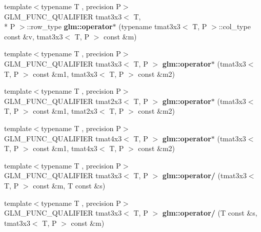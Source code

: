 \begin{DoxyCompactItemize}
\item 
\hypertarget{namespaceglm_a12af2d564dc38d2f7051131cd51d4c66}{{\footnotesize template$<$typename T , precision P$>$ }\\G\-L\-M\-\_\-\-F\-U\-N\-C\-\_\-\-Q\-U\-A\-L\-I\-F\-I\-E\-R tmat3x3$<$ T, \\*
P $>$\-::row\-\_\-type {\bfseries glm\-::operator$\ast$} (typename tmat3x3$<$ T, P $>$\-::col\-\_\-type const \&v, tmat3x3$<$ T, P $>$ const \&m)}\label{namespaceglm_a12af2d564dc38d2f7051131cd51d4c66}

\item 
\hypertarget{namespaceglm_aa501d4e3af1aca4edd6f5b6948003b32}{{\footnotesize template$<$typename T , precision P$>$ }\\G\-L\-M\-\_\-\-F\-U\-N\-C\-\_\-\-Q\-U\-A\-L\-I\-F\-I\-E\-R tmat3x3$<$ T, P $>$ {\bfseries glm\-::operator$\ast$} (tmat3x3$<$ T, P $>$ const \&m1, tmat3x3$<$ T, P $>$ const \&m2)}\label{namespaceglm_aa501d4e3af1aca4edd6f5b6948003b32}

\item 
\hypertarget{namespaceglm_a9c8814fa299560df98d85fac278b4368}{{\footnotesize template$<$typename T , precision P$>$ }\\G\-L\-M\-\_\-\-F\-U\-N\-C\-\_\-\-Q\-U\-A\-L\-I\-F\-I\-E\-R tmat2x3$<$ T, P $>$ {\bfseries glm\-::operator$\ast$} (tmat3x3$<$ T, P $>$ const \&m1, tmat2x3$<$ T, P $>$ const \&m2)}\label{namespaceglm_a9c8814fa299560df98d85fac278b4368}

\item 
\hypertarget{namespaceglm_a455124669156dc328dda186d05d35640}{{\footnotesize template$<$typename T , precision P$>$ }\\G\-L\-M\-\_\-\-F\-U\-N\-C\-\_\-\-Q\-U\-A\-L\-I\-F\-I\-E\-R tmat4x3$<$ T, P $>$ {\bfseries glm\-::operator$\ast$} (tmat3x3$<$ T, P $>$ const \&m1, tmat4x3$<$ T, P $>$ const \&m2)}\label{namespaceglm_a455124669156dc328dda186d05d35640}

\item 
\hypertarget{namespaceglm_ade5176afdca622b631e3d888fdf4123c}{{\footnotesize template$<$typename T , precision P$>$ }\\G\-L\-M\-\_\-\-F\-U\-N\-C\-\_\-\-Q\-U\-A\-L\-I\-F\-I\-E\-R tmat3x3$<$ T, P $>$ {\bfseries glm\-::operator/} (tmat3x3$<$ T, P $>$ const \&m, T const \&s)}\label{namespaceglm_ade5176afdca622b631e3d888fdf4123c}

\item 
\hypertarget{namespaceglm_a7d4f89aa05e37451317e56564a22c6c2}{{\footnotesize template$<$typename T , precision P$>$ }\\G\-L\-M\-\_\-\-F\-U\-N\-C\-\_\-\-Q\-U\-A\-L\-I\-F\-I\-E\-R tmat3x3$<$ T, P $>$ {\bfseries glm\-::operator/} (T const \&s, tmat3x3$<$ T, P $>$ const \&m)}\label{namespaceglm_a7d4f89aa05e37451317e56564a22c6c2}


\end{DoxyCompactItemize}
